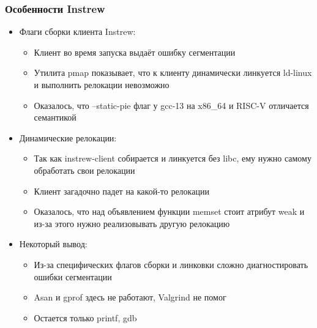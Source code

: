 \documentclass{beamer}
\begin{document}
\begin{frame}[fragile]
  \frametitle{Особенности Instrew}
  \begin{itemize}
    \item Флаги сборки клиента Instrew:
          \begin{itemize}
            \item Клиент во время запуска выдаёт ошибку сегментации
            \item Утилита pmap показывает, что к клиенту динамически линкуется ld-linux и выполнить релокации невозможно
            \item Оказалось, что --static-pie флаг у gcc-13 на x86\_64 и RISC-V отличается семантикой
          \end{itemize}
    \item Динамические релокации:
          \begin{itemize}
            \item Так как instrew-client собирается и линкуется без libc, ему нужно самому обработать свои релокации
            \item Клиент загадочно падет на какой-то релокации
            \item Оказалось, что над объявлением функции memset стоит атрибут weak и из-за этого нужно реализовывать другую релокацию
          \end{itemize}
    \item Некоторый вывод:
          \begin{itemize}
            \item Из-за специфических флагов сборки и линковки сложно диагностировать ошибки сегментации
            \item Asan и gprof здесь не работают, Valgrind не помог
            \item Остается только printf, gdb
          \end{itemize}
  \end{itemize}
\end{frame}
\end{document}
